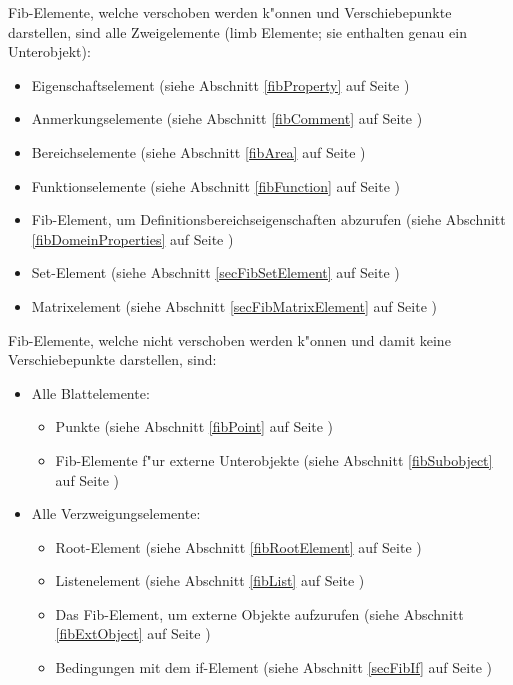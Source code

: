 \bigskip\noindent
Fib-Elemente, welche verschoben werden k"onnen und Verschiebepunkte darstellen, sind alle Zweigelemente (limb Elemente; sie enthalten genau ein Unterobjekt):
\begin{itemize}
 \item Eigenschaftselement (siehe Abschnitt \ref{fibProperty} auf Seite \pageref{fibProperty})
 \item Anmerkungselemente (siehe Abschnitt \ref{fibComment} auf Seite \pageref{fibComment})
 \item Bereichselemente (siehe Abschnitt \ref{fibArea} auf Seite \pageref{fibArea})
 \item Funktionselemente (siehe Abschnitt \ref{fibFunction} auf Seite \pageref{fibFunction})
 \item Fib-Element, um Definitionsbereichseigenschaften abzurufen (siehe Abschnitt \ref{fibDomeinProperties} auf Seite \pageref{fibDomeinProperties})
 \item Set-Element (siehe Abschnitt \ref{secFibSetElement} auf Seite \pageref{secFibSetElement})
 \item Matrixelement (siehe Abschnitt \ref{secFibMatrixElement} auf Seite \pageref{secFibMatrixElement})
\end{itemize}

\bigskip\noindent
Fib-Elemente, welche nicht verschoben werden k"onnen und damit keine Verschiebepunkte darstellen, sind:
\begin{itemize}
 \item Alle Blattelemente:
 \begin{itemize}
  \item Punkte (siehe Abschnitt \ref{fibPoint} auf Seite \pageref{fibPoint})
  \item Fib-Elemente f"ur externe Unterobjekte (siehe Abschnitt \ref{fibSubobject} auf Seite \pageref{fibSubobject})
 \end{itemize}
 \item Alle Verzweigungselemente:
 \begin{itemize}
  \item Root-Element (siehe Abschnitt \ref{fibRootElement} auf Seite \pageref{fibRootElement})
  \item Listenelement (siehe Abschnitt \ref{fibList} auf Seite \pageref{fibList})
  \item Das Fib-Element, um externe Objekte aufzurufen (siehe Abschnitt \ref{fibExtObject} auf Seite \pageref{fibExtObject})
  \item Bedingungen mit dem if-Element (siehe Abschnitt \ref{secFibIf} auf Seite \pageref{secFibIf})
 \end{itemize}
\end{itemize}

